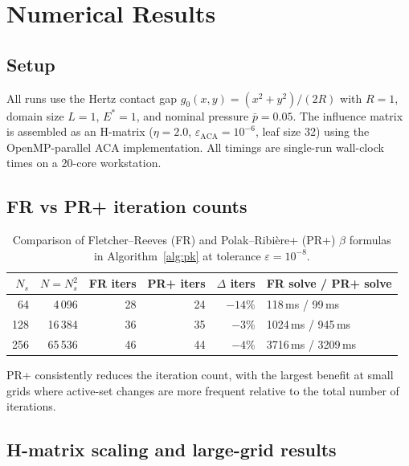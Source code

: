 \documentclass[11pt,a4paper]{article}
\begin{document}
\section{Numerical Results}
\label{sec:numerics}

\subsection{Setup}

All runs use the Hertz contact gap
$g_0(x,y) = (x^2 + y^2)/(2R)$ with $R = 1$, domain size $L = 1$,
$E^* = 1$, and nominal pressure $\bar p = 0.05$.
The influence matrix is assembled as an H-matrix
($\eta = 2.0$, $\varepsilon_{\mathrm{ACA}} = 10^{-6}$, leaf size 32)
using the OpenMP-parallel ACA implementation.
All timings are single-run wall-clock times on a 20-core workstation.

\subsection{FR vs PR+ iteration counts}

\begin{table}[ht]
\centering
\caption{Comparison of Fletcher--Reeves (FR) and Polak--Ribi\`ere+ (PR+)
         $\beta$ formulas in Algorithm~\ref{alg:pk} at tolerance $\varepsilon = 10^{-8}$.}
\label{tab:iter}
\begin{tabular}{@{}rrrrrl@{}}
\toprule
$N_s$ & $N = N_s^2$ & FR iters & PR+ iters & $\Delta$ iters & FR solve / PR+ solve \\
\midrule
 64  &     4\,096 & 28 & 24 & $-14\%$ & 118\,ms / 99\,ms \\
128  &    16\,384 & 36 & 35 & $-3\%$  & 1024\,ms / 945\,ms \\
256  &    65\,536 & 46 & 44 & $-4\%$  & 3716\,ms / 3209\,ms \\
\bottomrule
\end{tabular}
\end{table}

PR+ consistently reduces the iteration count, with the largest benefit at
small grids where active-set changes are more frequent relative to the
total number of iterations.

\subsection{H-matrix scaling and large-grid results}
\end{document}
